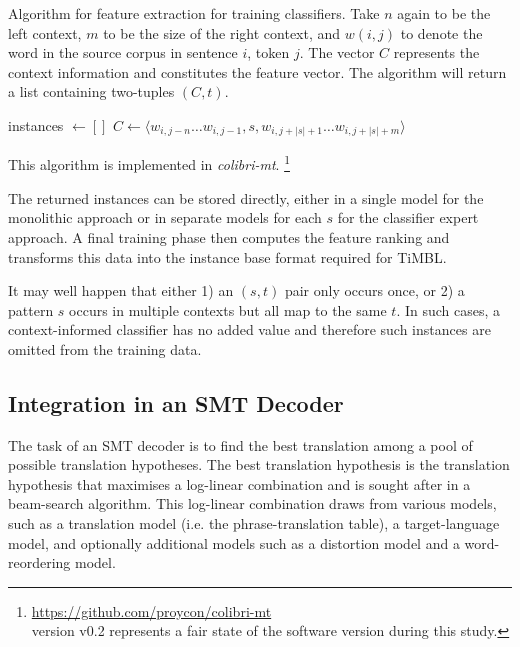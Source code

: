 \begin{algorithm}
\caption{Algorithm for feature extraction for training classifiers.  Take $n$
again to be the left context, $m$ to be the size of the right context, and
$w{(i,j)}$ to denote the word in the source corpus in sentence $i$, token $j$.
The vector $C$ represents the context information and constitutes the feature
vector.  The algorithm will return a list containing two-tuples $(C,t)$.  }
\label{alg:featureextract}
\begin{algorithmic}
\State instances $\gets []$
        \State $C \gets \langle w_{i,j-n} \ldots w_{i,j-1}, s, w_{i,j+|s|+1} \ldots w_{i,j+|s|+m} \rangle$
        \State {} 
      \EndFor
  \EndFor
\EndFor \\
\end{algorithmic}
\end{algorithm}
    
\noindent
This algorithm is implemented in \emph{colibri-mt}.
\footnote{\url{https://github.com/proycon/colibri-mt} \\ version v0.2
represents a fair state of the software version during this study.}

The returned instances can be stored directly, either in a single model for the
monolithic approach or in separate models for each $s$ for the classifier
expert approach. A final training phase then computes the feature ranking and
transforms this data into the instance base format required for TiMBL.

It may well happen that either 1) an $(s,t)$ pair only occurs once, or
2) a pattern $s$ occurs in multiple contexts but all map to the same
$t$. In such cases, a context-informed classifier has no added value
and therefore such instances are omitted from the training data.

\subsection{Integration in an SMT Decoder}
\label{sec:smtintegration}

The task of an SMT decoder is to find the best translation among a pool
of possible translation hypotheses. The best translation hypothesis is the
translation hypothesis that maximises a log-linear combination and is sought
after in a beam-search algorithm. This log-linear combination draws from
various models, such as a translation model (i.e. the phrase-translation
table), a target-language model, and optionally additional models such as a
distortion model and a word-reordering model. 

